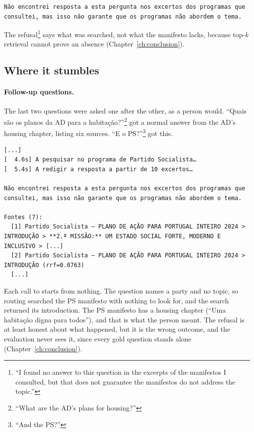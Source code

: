 \begin{Verbatim}[fontsize=\scriptsize, breaklines=true, frame=single]
Não encontrei resposta a esta pergunta nos excertos dos programas que consultei, mas isso não garante que os programas não abordem o tema.
\end{Verbatim}

The refusal\footnote{``I found no answer to this question in the excerpts of
the manifestos I consulted, but that does not guarantee the manifestos do not
address the topic.''} says what was searched, not what the manifesto lacks,
because top-$k$ retrieval cannot prove an absence (Chapter~\ref{ch:conclusion}).

\subsection{Where it stumbles} \label{subsec:results-stumbles}

\paragraph{Follow-up questions.} The last two questions were asked one after
the other, as a person would. ``Quais são os planos da AD para a
habitação?''\footnote{``What are the AD's plans for housing?''} got a normal
answer from the AD's housing chapter, listing six sources. ``E o PS?''\footnote{``And
the PS?''} got this.

\begin{Verbatim}[fontsize=\scriptsize, breaklines=true, frame=single]
[...]
[  4.6s] A pesquisar no programa de Partido Socialista…
[  5.4s] A redigir a resposta a partir de 10 excertos…

Não encontrei resposta a esta pergunta nos excertos dos programas que consultei, mas isso não garante que os programas não abordem o tema.

Fontes (7):
  [1] Partido Socialista – PLANO DE AÇÃO PARA PORTUGAL INTEIRO 2024 > INTRODUÇÃO > **2.ª MISSÃO:** UM ESTADO SOCIAL FORTE, MODERNO E INCLUSIVO > [...]
  [2] Partido Socialista – PLANO DE AÇÃO PARA PORTUGAL INTEIRO 2024 > INTRODUÇÃO (rrf=0.0763)
  [...]
\end{Verbatim}

Each call to \sysname{} starts from nothing. The question names a party and
no topic, so routing searched the PS manifesto with nothing to look for, and
the search returned its introduction. The PS manifesto has a housing chapter (``Uma
habitação digna para todos''), and that is what the person meant. The refusal is at least honest about what happened,
but it is the wrong outcome, and the evaluation never sees it, since every
gold question stands alone (Chapter~\ref{ch:conclusion}).


